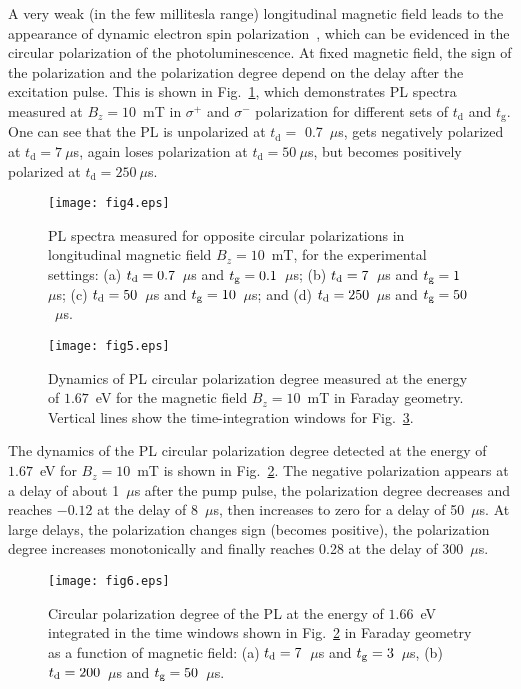 \documentclass[twocolumn,showpacs,preprintnumbers,amsmath,amssymb,aps]{revtex4-1}
\begin{document}
A very weak (in the few millitesla range) longitudinal magnetic field
leads to the appearance of dynamic electron spin
polarization~\cite{Smirnov125}, which can be evidenced in the circular
polarization of the photoluminescence. At fixed magnetic field, the
sign of the polarization and the polarization degree depend on the delay
after the excitation pulse. This is shown in Fig.~\ref{fig4}, which
demonstrates PL spectra measured at $B_z=10$~mT in $\sigma^+$ and
$\sigma^-$ polarization for different sets of $t_{\text{d}}$ and $t_{\text{g}}$. One can see that the PL is unpolarized at $t_{\text{d}} =$ 0.7~$\mu$s, gets negatively polarized at $t_{\text{d}}=7~\mu$s, again loses polarization at $t_{\text{d}}=50~\mu$s, but becomes
positively polarized at $t_{\text{d}}=250~\mu$s.

\begin{figure}[t]
\centering
\texttt{[image: fig4.eps]}
\caption{PL spectra measured for opposite circular polarizations in
longitudinal magnetic field $B_z=10$~mT, for the experimental settings: (a)
$t_{\rm d}=0.7$~$\mu$s and $t_{\rm g}=0.1$~$\mu$s; (b) $t_{\rm
d}=7$~$\mu$s and $t_{\rm g}=1$~$\mu$s; (c) $t_{\rm d}=50$~$\mu$s and
$t_{\rm g}=10$~$\mu$s; and (d) $t_{\rm d}=250$~$\mu$s and $t_{\rm
g}=50$~$\mu$s.} \label{fig4}
\end{figure}

\begin{figure}[t]
\centering
\texttt{[image: fig5.eps]}
\caption{Dynamics  of  PL  circular  polarization degree measured
at the energy of $1.67$~eV for the magnetic field $B_z=10$~mT in Faraday
geometry. Vertical lines show the time-integration windows for
Fig.~\ref{fig6}.} \label{fig5}
\end{figure}

The dynamics  of the PL circular polarization degree detected at the
energy of $1.67$~eV for $B_z=10$~mT is shown in Fig.~\ref{fig5}. The negative polarization appears at a delay of about 1~$\mu$s after the pump pulse, the polarization degree decreases
and reaches $-0.12$ at the delay of 8~$\mu$s,  then increases to zero
for a delay of 50~$\mu$s. At large delays, the polarization changes
sign (becomes positive), the polarization degree increases
monotonically and finally reaches 0.28 at the delay of 300~$\mu$s.

\begin{figure}[t]
\centering
\texttt{[image: fig6.eps]}
\caption{Circular polarization degree of the PL at the energy of
$1.66$~eV integrated in the time windows shown in Fig.~\ref{fig5} in
Faraday geometry as a function of magnetic field: (a) $t_{\rm
d}=7$~$\mu$s and $t_{\rm g}=3$~$\mu$s, (b) $t_{\rm d}=200$~$\mu$s
and $t_{\rm g}=50$~$\mu$s.} \label{fig6}
\end{figure}
\end{document}
